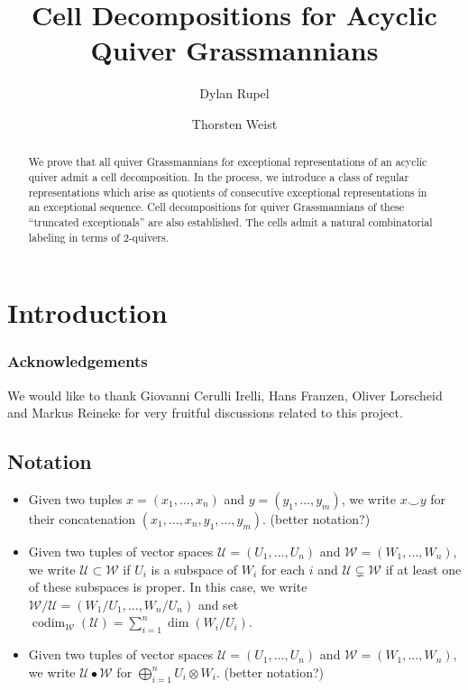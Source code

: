 \documentclass{amsart}
\title{Cell Decompositions for Acyclic Quiver Grassmannians}
\author{Dylan Rupel}
\author{Thorsten Weist}
\numberwithin{equation}{section}
\newcommand{\cU}{\mathcal{U}}
\newcommand{\cW}{\mathcal{W}}
\newcommand{\codim}{\operatorname{codim}}
\begin{document}
\begin{abstract}
  We prove that all quiver Grassmannians for exceptional representations of an acyclic quiver admit a cell decomposition.  
  In the process, we introduce a class of regular representations which arise as quotients of consecutive exceptional representations in an exceptional sequence.
  Cell decompositions for quiver Grassmannians of these ``truncated exceptionals'' are also established. 
  The cells admit a natural combinatorial labeling in terms of 2-quivers.
\end{abstract}

\setcounter{tocdepth}{2}

\maketitle
\tableofcontents


\section{Introduction}

\subsubsection*{Acknowledgements}
We would like to thank Giovanni Cerulli Irelli, Hans Franzen, Oliver Lorscheid and Markus Reineke for very fruitful discussions related to this project.


\subsection{Notation}
\begin{itemize}
  \item Given two tuples $x=(x_1,\ldots,x_n)$ and $y=(y_1,\ldots,y_m)$, we write $x\smile y$ for their concatenation $(x_1,\ldots,x_n,y_1,\ldots,y_m)$. (better notation?)
  \item Given two tuples of vector spaces $\cU=(U_1,\ldots,U_n)$ and $\cW=(W_1,\ldots,W_n)$, we write $\cU\subset\cW$ if $U_i$ is a subspace of $W_i$ for each $i$ and $\cU\subsetneq\cW$ if at least one of these subspaces is proper.
    In this case, we write $\cW/\cU=(W_1/U_1,\ldots,W_n/U_n)$ and set $\codim_\cW(\cU)=\sum\limits_{i=1}^n \dim(W_i/U_i)$.
  \item Given two tuples of vector spaces $\cU=(U_1,\ldots,U_n)$ and $\cW=(W_1,\ldots,W_n)$, we write $\cU\bullet\cW$ for $\bigoplus_{i=1}^n U_i\otimes W_i$. (better notation?)
\end{itemize}
\end{document}
